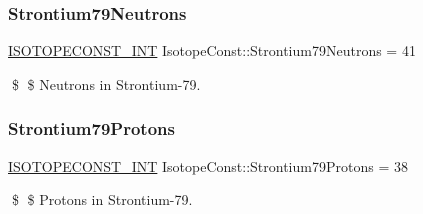 \subsubsection{\texorpdfstring{Strontium79\+Neutrons}{Strontium79Neutrons}}
{\footnotesize\ttfamily \mbox{\hyperlink{group___isotope_const-_macros_ga5f18360b3e99483a35c32d789e62621c}{I\+S\+O\+T\+O\+P\+E\+C\+O\+N\+S\+T\+\_\+\+I\+NT}} Isotope\+Const\+::\+Strontium79\+Neutrons = 41}

\$ \$ Neutrons in Strontium-\/79. \mbox{\label{group___isotope_const-_strontium-_sr79_gaa9681827eda0e840cafefe343f9fb2ad}} 
\subsubsection{\texorpdfstring{Strontium79\+Protons}{Strontium79Protons}}
{\footnotesize\ttfamily \mbox{\hyperlink{group___isotope_const-_macros_ga5f18360b3e99483a35c32d789e62621c}{I\+S\+O\+T\+O\+P\+E\+C\+O\+N\+S\+T\+\_\+\+I\+NT}} Isotope\+Const\+::\+Strontium79\+Protons = 38}

\$ \$ Protons in Strontium-\/79. 